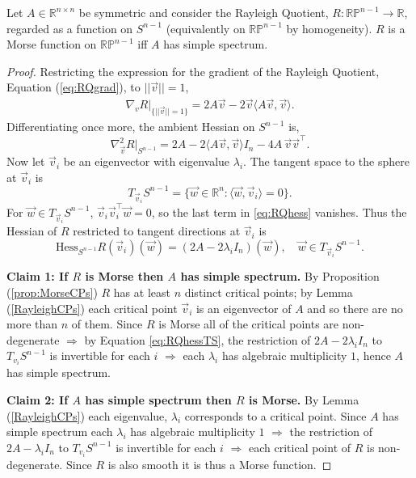 \begin{proposition}\label{prop:MorseSS}
Let $A\in\mathbb R^{n\times n}$ be symmetric and consider the Rayleigh Quotient, $R:\mathbb{RP}^{n-1}\rightarrow\mathbb{R}$, regarded as a function on $S^{n-1}$ (equivalently on $\mathbb{RP}^{n-1}$ by homogeneity). $R$ is a Morse function on $\mathbb{RP}^{n-1}$ iff $A$ has simple spectrum.
\end{proposition}
\begin{proof}
Restricting the expression for the gradient of the Rayleigh Quotient, Equation (\ref{eq:RQgrad}), to $||\vec{v}||=1$,
\begin{align*}
\nabla_{v} R \big|_{\{||\vec{v}||=1\}} = 2A\vec{v}- 2\vec{v}\langle A\vec{v}, \vec{v} \rangle.
\end{align*}
Differentiating once more, the ambient Hessian on $S^{n-1}$ is,
\begin{equation}\label{eq:RQhess}
\nabla^2_{\vec{v}} R \big|_{S^{n-1}} = 2A - 2\langle A\vec{v},\vec{v}\rangle I_n - 4A\,\vec{v} \vec{v}^{\top}.
\end{equation}
Now let $\vec{v}_i$ be an eigenvector with eigenvalue $\lambda_i$. The tangent space to the sphere at $\vec v_i$ is
\[
T_{\vec{v}_i}S^{n-1} = \{ \vec{w}\in \mathbb{R}^n : \langle \vec{w},\vec{v}_i\rangle = 0\}.
\]
For $\vec{w} \in T_{\vec{v}_i}S^{n-1}$, $\vec{v}_i\vec{v}_i^{\top}\vec{w}=0$, so the last term in \eqref{eq:RQhess} vanishes. Thus the Hessian of $R$ restricted to tangent directions at $\vec v_i$ is
\begin{equation}
\label{eq:RQhessTS}
\text{Hess}_{S^{n-1}} R(\vec v_i)(\vec w) = (2A - 2\lambda_i I_n)(\vec{w}), 
\quad \vec w \in T_{\vec v_i} S^{n-1}.    
\end{equation}

\textbf{Claim 1: If $R$ is Morse then $A$ has simple spectrum.} By Proposition (\ref{prop:MorseCPs}) $R$ has at least $n$ distinct critical points; by Lemma (\ref{RayleighCPs}) each critical point $\vec{v}_i$ is an eigenvector of $A$ and so there are no more than $n$ of them. Since $R$ is Morse all of the critical points are non-degenerate $\Rightarrow$ by Equation \eqref{eq:RQhessTS}, the restriction of $2A-2\lambda_i I_n$ to $T_{v_i}S^{n-1}$ is invertible for each $i$ $\Rightarrow$ each $\lambda_i$ has algebraic multiplicity $1$, hence $A$ has simple spectrum.

\textbf{Claim 2: If $A$ has simple spectrum then $R$ is Morse.} By Lemma (\ref{RayleighCPs}) each eigenvalue, $\lambda_i$ corresponds to a critical point. Since $A$ has simple spectrum each $\lambda_i$ has algebraic multiplicity $1$ $\Rightarrow$ the restriction of $2A-\lambda_i I_n$ to $T_{v_i}S^{n-1}$ is invertible for each $i$ $\Rightarrow$ each critical point of $R$ is non-degenerate. Since  $R$ is also smooth it is thus a Morse function.
\end{proof}



